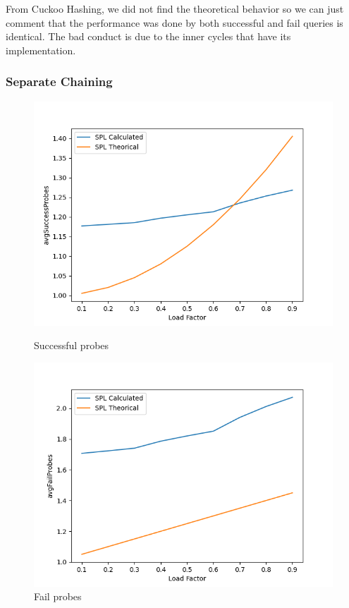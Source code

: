 \documentclass{article}
\begin{document}
    From Cuckoo Hashing, we did not find the theoretical behavior so we can just comment that the performance was done by both successful and fail queries is identical. The bad conduct is due to the inner cycles that have its implementation.
    
    \subsubsection*{Separate Chaining}

        \begin{figure}[!h]
          \includegraphics[width=\linewidth]{images/loadFactor_vs_avgSuccessProbes_SPL.png}
          \caption{Successful probes}\label{fig:plot12}
        \endminipage\hfill
          \includegraphics[width=\linewidth]{images/loadFactor_vs_avgFailProbes_SPL.png}
          \caption{Fail probes}\label{fig:plot13}
        \endminipage
    \end{figure}
\end{document}
